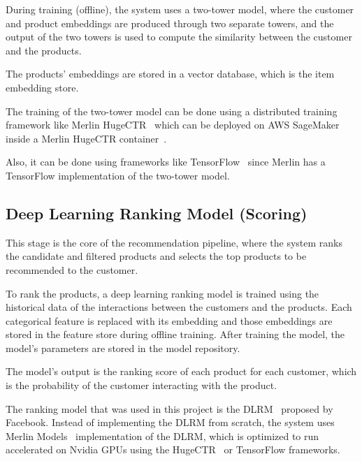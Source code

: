 During training (offline), the system uses a two-tower model, where the customer and product embeddings are produced through two separate towers, 
and the output of the two towers is used to compute the similarity between the customer and the products.

The products' embeddings are stored in a vector database, which is the item embedding store.

The training of the two-tower model can be done using a distributed training framework like Merlin HugeCTR~\cite{NvidiaHugeCTR}
which can be deployed on AWS SageMaker~\cite{AwsSageMaker} inside a Merlin HugeCTR container~\cite{HugeCTRContainer}.

Also, it can be done using frameworks like TensorFlow~\cite{NvidiaMerlinTf} since Merlin has a TensorFlow implementation of the two-tower model.



\subsection{Deep Learning Ranking Model (Scoring)}

This stage is the core of the recommendation pipeline, where the system ranks the candidate and filtered products and selects the top products to be recommended to the customer.

To rank the products, a deep learning ranking model is trained using the historical data of the interactions between the customers and the products.
Each categorical feature is replaced with its embedding and those embeddings are stored in the feature store during offline training. 
After training the model, the model's parameters are stored in the model repository.

The model's output is the ranking score of each product for each customer, which is the probability of the customer interacting with the product.

The ranking model that was used in this project is the DLRM~\cite{facebook_dlrm} proposed by Facebook.
Instead of implementing the DLRM from scratch, 
the system uses Merlin Models~\cite{MerlinModels}
 implementation of the DLRM, 
 which is optimized to run accelerated on Nvidia GPUs using the HugeCTR~\cite{NvidiaHugeCTR} or TensorFlow frameworks.



